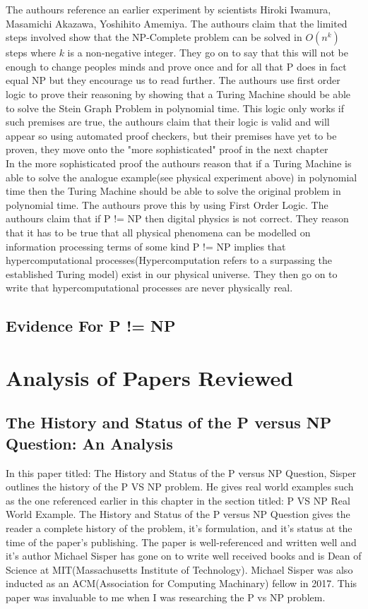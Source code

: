 \documentclass{report}
\begin{document}
The authours reference an earlier experiment by scientists Hiroki Iwamura, Masamichi Akazawa, Yoshihito Amemiya\cite{Iwamura}.  The authours claim that the limited steps involved show that the NP-Complete problem can be solved in $O(n^k)$ steps where $k$ is a non-negative integer.  They go on to say that this will not be enough to change peoples minds and prove once and for all that P does in fact equal NP but they encourage us to read further.  The authours use first order logic to prove their reasoning by showing that a Turing Machine should be able to solve the Stein Graph Problem\cite{Steiner} in polynomial time.  This logic only works if such premises are true, the authours claim that their logic is valid and will appear so using automated proof checkers, but their premises have yet to be proven, they move onto the "more sophisticated" proof in the next chapter\cite{PVsNPSolved}
\\
In the more sophisticated proof the authours reason that if a Turing Machine is able to solve the analogue example(see physical experiment above) in polynomial time then the Turing Machine should be able to solve the original problem in polynomial time.  The authours prove this by using First Order Logic\cite{Logic}.  The authours claim that if P != NP then digital physics\cite{Zuse} is not correct.  They reason that it has to be true that all physical phenomena can be modelled on information processing terms of some kind P != NP implies that hypercomputational processes(Hypercomputation refers to a surpassing the established Turing model)\cite{Wells_2004} exist in our physical universe.  They then go on to write that hypercomputational processes are never physically real.
\subsection{Evidence For P != NP}

\section{Analysis of Papers Reviewed}
\subsection{The History and Status of the P versus NP Question: An Analysis}
In this paper titled: The History and Status of the P versus NP Question\cite{HistoryOfPVsNP}, Sisper outlines the history of the P VS NP problem.  He gives real world examples such as the one referenced earlier in this chapter in the section titled: P VS NP Real World Example.  The History and Status of the P versus NP Question gives the reader a complete history of the problem, it's formulation, and it's status at the time of the paper's publishing.  The paper is well-referenced and written well and it's author Michael Sisper has gone on to write well received books\cite{Sisperbib} and is Dean of Science at MIT(Massachusetts Institute of Technology)\cite{Sisperdean}.  Michael Sisper was also inducted as an ACM(Association for Computing Machinary) fellow in 2017\cite{Sisperacm}. This paper was invaluable to me when I was researching the P vs NP problem.
\end{document}

